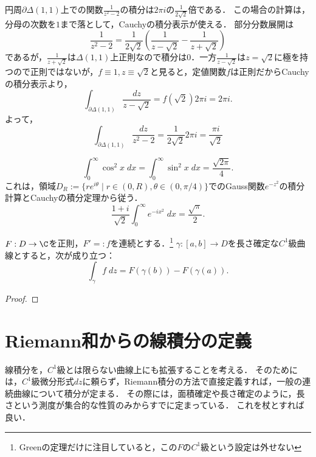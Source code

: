 \documentclass[uplatex, dvipdfmx]{jsreport}
\begin{document}
\begin{example}[中心がズレた単位円周上での積分]
    円周$\partial\Delta(1,1)$上での関数$\frac{1}{z^2-2}$の積分は$2\pi i$の$\frac{1}{2\sqrt{2}}$倍である．
    この場合の計算は，分母の次数を$1$まで落として，Cauchyの積分表示が使える．
    部分分数展開は
    \[ \frac{1}{z^2-2}=\frac{1}{2\sqrt{2}}\left(\frac{1}{z-\sqrt{2}}-\frac{1}{z+\sqrt{2}}\right) \]
    であるが，$\frac{1}{z+\sqrt{2}}$は$\Delta(1,1)$上正則なので積分は$0$．一方$\frac{1}{z-\sqrt{2}}$は$z=\sqrt{2}$に極を持つので正則ではないが，$f\equiv 1,z\equiv\sqrt{2}$と見ると，定値関数$f$は正則だからCauchyの積分表示より，
    \[ \int_{\partial\Delta(1,1)}\frac{dz}{z-\sqrt{2}}=f(\sqrt{2})2\pi i=2\pi i. \]
    よって，
    \[ \int_{\partial\Delta(1,1)}\frac{dz}{z^2-2} = \frac{1}{2\sqrt{2}}2\pi i = \frac{\pi i}{\sqrt{2}} \]
\end{example}

\begin{example}[Fresnel積分]\label{example-Fresnel-integral}
    \[ \int^\infty_0\cos^2x\;dx=\int^\infty_0\sin^2x\;dx=\frac{\sqrt{2\pi}}{4}. \]
    これは，領域$D_R:=\{re^{i\theta}\mid r\in(0,R),\theta\in(0,\pi/4)\}$でのGauss関数$e^{-z^2}$の積分計算とCauchyの積分定理から従う．
    \[ \frac{1+i}{\sqrt{2}}\int^\infty_0e^{-ix^2}\;dx=\frac{\sqrt{\pi}}{2}. \]
\end{example}

\begin{theorem}
    $F:D\to\C$を正則，$F'=:f$を連続とする．\footnote{Greenの定理だけに注目していると，この$F$の$C^1$級という設定は外せない}
    $\gamma:[a,b]\to D$を長さ確定な$C^1$級曲線とすると，次が成り立つ：
    \[ \int_\gamma f\;dz=F(\gamma(b))-F(\gamma(a)). \]
\end{theorem}
\begin{proof}
    
\end{proof}

\section{Riemann和からの線積分の定義}\label{sec-redefinement-of-line-integral}

\begin{screen}
    線積分を，$C^1$級とは限らない曲線上にも拡張することを考える．
    そのためには，$C^1$級微分形式$dz$に頼らず，Riemann積分の方法で直接定義すれば，一般の連続曲線について積分が定まる．
    その際には，面積確定や長さ確定のように，長さという測度が集合的な性質のみからすでに定まっている．
    これを杖とすれば良い．
\end{screen}
\end{document}
